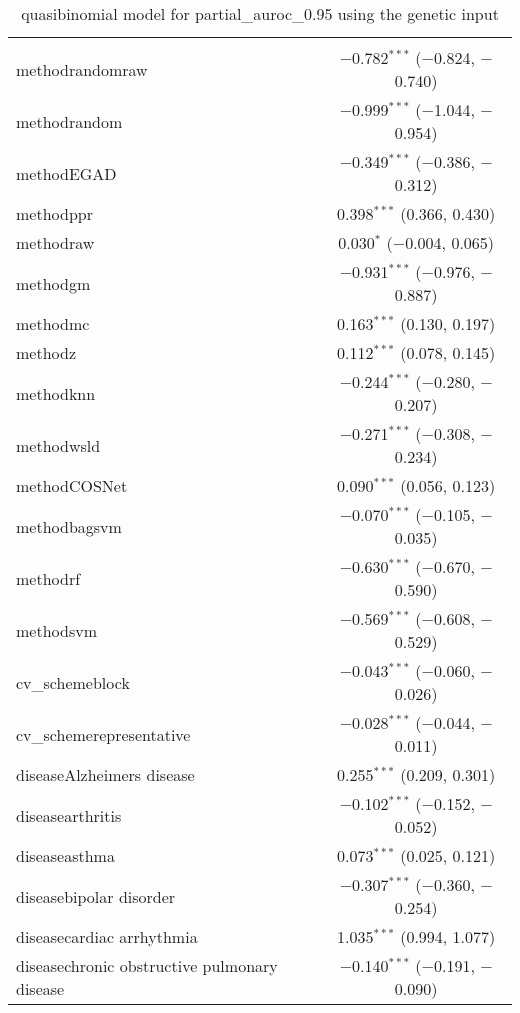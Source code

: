 
\begin{table}[!htbp] \centering 
  \caption{quasibinomial model for partial_auroc_0.95 using the genetic input} 
  \label{} 
\begin{tabular}{@{\extracolsep{5pt}}lc} 
\\[-1.8ex]\hline 
\hline \\[-1.8ex] 
 methodrandomraw & $-$0.782$^{***}$ ($-$0.824, $-$0.740) \\ 
  methodrandom & $-$0.999$^{***}$ ($-$1.044, $-$0.954) \\ 
  methodEGAD & $-$0.349$^{***}$ ($-$0.386, $-$0.312) \\ 
  methodppr & 0.398$^{***}$ (0.366, 0.430) \\ 
  methodraw & 0.030$^{*}$ ($-$0.004, 0.065) \\ 
  methodgm & $-$0.931$^{***}$ ($-$0.976, $-$0.887) \\ 
  methodmc & 0.163$^{***}$ (0.130, 0.197) \\ 
  methodz & 0.112$^{***}$ (0.078, 0.145) \\ 
  methodknn & $-$0.244$^{***}$ ($-$0.280, $-$0.207) \\ 
  methodwsld & $-$0.271$^{***}$ ($-$0.308, $-$0.234) \\ 
  methodCOSNet & 0.090$^{***}$ (0.056, 0.123) \\ 
  methodbagsvm & $-$0.070$^{***}$ ($-$0.105, $-$0.035) \\ 
  methodrf & $-$0.630$^{***}$ ($-$0.670, $-$0.590) \\ 
  methodsvm & $-$0.569$^{***}$ ($-$0.608, $-$0.529) \\ 
  cv\_schemeblock & $-$0.043$^{***}$ ($-$0.060, $-$0.026) \\ 
  cv\_schemerepresentative & $-$0.028$^{***}$ ($-$0.044, $-$0.011) \\ 
  diseaseAlzheimers disease & 0.255$^{***}$ (0.209, 0.301) \\ 
  diseasearthritis & $-$0.102$^{***}$ ($-$0.152, $-$0.052) \\ 
  diseaseasthma & 0.073$^{***}$ (0.025, 0.121) \\ 
  diseasebipolar disorder & $-$0.307$^{***}$ ($-$0.360, $-$0.254) \\ 
  diseasecardiac arrhythmia & 1.035$^{***}$ (0.994, 1.077) \\ 
  diseasechronic obstructive pulmonary disease & $-$0.140$^{***}$ ($-$0.191, $-$0.090) \\ 

\end{tabular}
\end{table}
